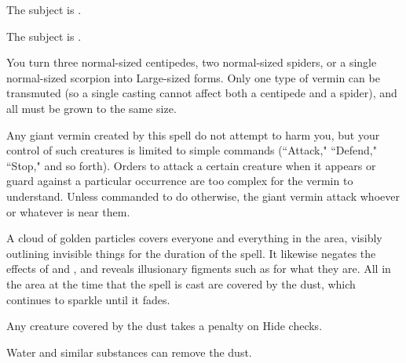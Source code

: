 \begin{spellhealthy}
    The subject is \sickened.
\end{spellhealthy}
\begin{spellblood}
    The subject is \nauseated.
\end{spellblood}

\spelldur{\durmed}
\begin{spelleffect}
    You turn three normal-sized centipedes, two normal-sized spiders, or a single normal-sized scorpion into Large-sized forms. Only one type of vermin can be transmuted (so a single casting cannot affect both a centipede and a spider), and all must be grown to the same size.
    \par Any giant vermin created by this spell do not attempt to harm you, but your control of such creatures is limited to simple commands (``Attack," ``Defend," ``Stop," and so forth). Orders to attack a certain creature when it appears or guard against a particular occurrence are too complex for the vermin to understand. Unless commanded to do otherwise, the giant vermin attack whoever or whatever is near them.
\end{spelleffect}

\spelldur{\durshort}
\begin{spelleffect}
    A cloud of golden particles covers everyone and everything in the area, visibly outlining invisible things for the duration of the spell. It likewise negates the effects of  and , and reveals illusionary figments such as  for what they are. All in the area at the time that the spell is cast are covered by the dust, which continues to sparkle until it fades.
    \par Any creature covered by the dust takes a  penalty on Hide checks.
\end{spelleffect}
\begin{spelleffect}
    Water and similar substances can remove the dust.
\end{spelleffect}

